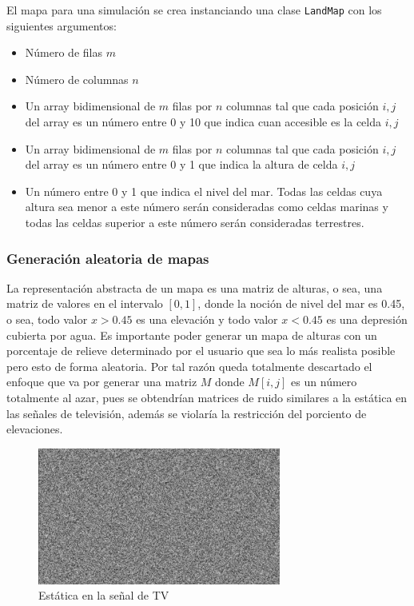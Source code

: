 El mapa para una simulación se crea instanciando una clase \verb|LandMap| con los siguientes argumentos:

\begin{itemize}
	\item Número de filas $m$
	\item Número de columnas $n$
	\item Un array bidimensional de $m$ filas por $n$ columnas tal que cada posición $i,j$ del array es un número entre 0 y 10 que indica cuan accesible es la celda $i,j$
	\item Un array bidimensional de $m$ filas por $n$ columnas tal que cada posición $i,j$ del array es un número entre 0 y 1 que indica la altura de celda $i,j$
	\item Un número entre 0 y 1 que indica el nivel del mar. Todas las celdas cuya altura sea menor a este número serán consideradas como celdas marinas y todas las celdas superior a este número serán consideradas terrestres.
\end{itemize}

\subsubsection{Generación aleatoria de mapas}

La representación abstracta de un mapa es una matriz de alturas, o sea, una matriz de valores en el intervalo $[0,1]$, donde la noción de nivel del mar es 0.45, o sea, todo valor $x > 0.45$ es una elevación y todo valor $x < 0.45$ es una depresión cubierta por agua. Es importante poder generar un mapa de alturas con un porcentaje de relieve determinado por el usuario que sea lo más realista posible pero esto de forma aleatoria. Por tal razón queda totalmente descartado el enfoque que va por generar una matriz $M$ donde $M[i,j]$ es un número totalmente al azar, pues se obtendrían matrices de ruido similares a la estática en las señales de televisión, además se violaría la restricción del porciento de elevaciones.

\begin{figure}
	\centering
	\includegraphics[width=8cm]{chapters/img/estatica.jpg}
	\caption{Estática en la señal de TV}
\end{figure}

